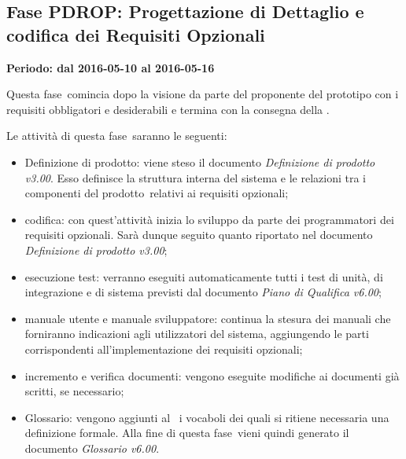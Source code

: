 \documentclass[../PianoProgetto.tex]{subfiles}
\begin{document}
	\subsection{Fase PDROP: Progettazione di Dettaglio e codifica dei Requisiti Opzionali}
		\textbf{Periodo: dal 2016-05-10 al 2016-05-16}
		
		Questa fase\g\ comincia dopo la visione da parte del proponente del prototipo con i requisiti obbligatori e desiderabili e termina con la consegna della \revisionediqualifica .

		Le attività di questa fase\g\ saranno le seguenti:
		\begin{itemize}
			\item Definizione di prodotto: viene steso il documento \textit{Definizione di prodotto v3.00}. Esso definisce la struttura interna del sistema e le relazioni tra i componenti del prodotto\g\ relativi ai requisiti opzionali;

			\item codifica: con quest'attività inizia lo sviluppo da parte dei programmatori dei requisiti opzionali. Sarà dunque seguito quanto riportato nel documento \textit{Definizione di prodotto v3.00};

			\item esecuzione test: verranno eseguiti automaticamente tutti i test di unità, di integrazione e di sistema previsti dal documento \textit{Piano di Qualifica v6.00};

			\item manuale utente e manuale sviluppatore: continua la stesura dei manuali che forniranno indicazioni agli utilizzatori del sistema, aggiungendo le parti corrispondenti all'implementazione dei requisiti opzionali;

			\item incremento e verifica documenti: vengono eseguite modifiche ai documenti già scritti, se necessario;
			
			\item Glossario: vengono aggiunti al \glossario\ i vocaboli dei quali si ritiene necessaria una definizione formale. Alla fine di questa fase\g\ vieni quindi generato il documento \textit{Glossario v6.00}.
		\end{itemize}
		
		
\end{document}
